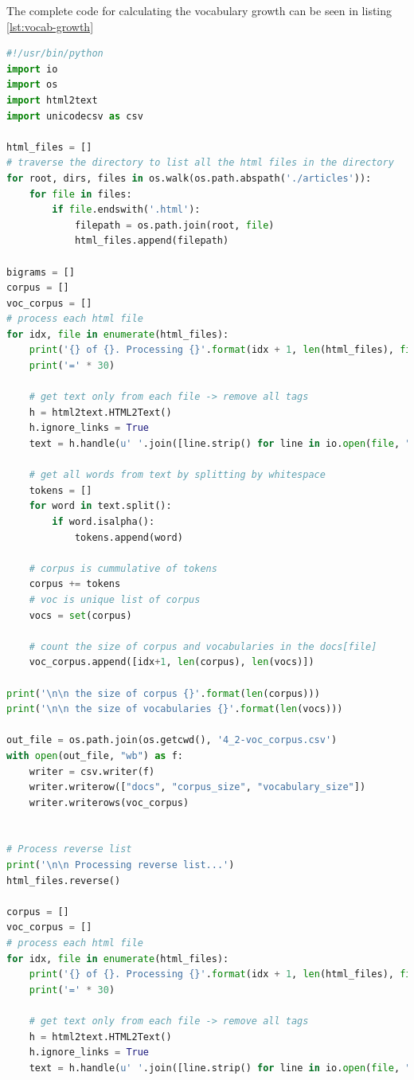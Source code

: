 \documentclass[letterpaper,11pt]{article}
\begin{document}
The complete code for calculating the vocabulary growth can be seen in listing \ref{lst:vocab-growth}

\begin{lstlisting}[language=python, caption={Source code for calculating vocabulary growth}, label={lst:vocab-growth}]
#!/usr/bin/python
import io
import os
import html2text
import unicodecsv as csv

html_files = []
# traverse the directory to list all the html files in the directory
for root, dirs, files in os.walk(os.path.abspath('./articles')):
    for file in files:
        if file.endswith('.html'):
            filepath = os.path.join(root, file)
            html_files.append(filepath)

bigrams = []
corpus = []
voc_corpus = []
# process each html file
for idx, file in enumerate(html_files):
    print('{} of {}. Processing {}'.format(idx + 1, len(html_files), file))
    print('=' * 30)

    # get text only from each file -> remove all tags
    h = html2text.HTML2Text()
    h.ignore_links = True
    text = h.handle(u' '.join([line.strip() for line in io.open(file, "r", encoding="utf-8").readlines()]))

    # get all words from text by splitting by whitespace
    tokens = []
    for word in text.split():
        if word.isalpha():
            tokens.append(word)

    # corpus is cummulative of tokens
    corpus += tokens
    # voc is unique list of corpus
    vocs = set(corpus)

    # count the size of corpus and vocabularies in the docs[file]
    voc_corpus.append([idx+1, len(corpus), len(vocs)])

print('\n\n the size of corpus {}'.format(len(corpus)))
print('\n\n the size of vocabularies {}'.format(len(vocs)))

out_file = os.path.join(os.getcwd(), '4_2-voc_corpus.csv')
with open(out_file, "wb") as f:
    writer = csv.writer(f)
    writer.writerow(["docs", "corpus_size", "vocabulary_size"])
    writer.writerows(voc_corpus)


# Process reverse list
print('\n\n Processing reverse list...')
html_files.reverse()

corpus = []
voc_corpus = []
# process each html file
for idx, file in enumerate(html_files):
    print('{} of {}. Processing {}'.format(idx + 1, len(html_files), file))
    print('=' * 30)

    # get text only from each file -> remove all tags
    h = html2text.HTML2Text()
    h.ignore_links = True
    text = h.handle(u' '.join([line.strip() for line in io.open(file, "r", encoding="utf-8").readlines()]))


\end{lstlisting}
\end{document}
